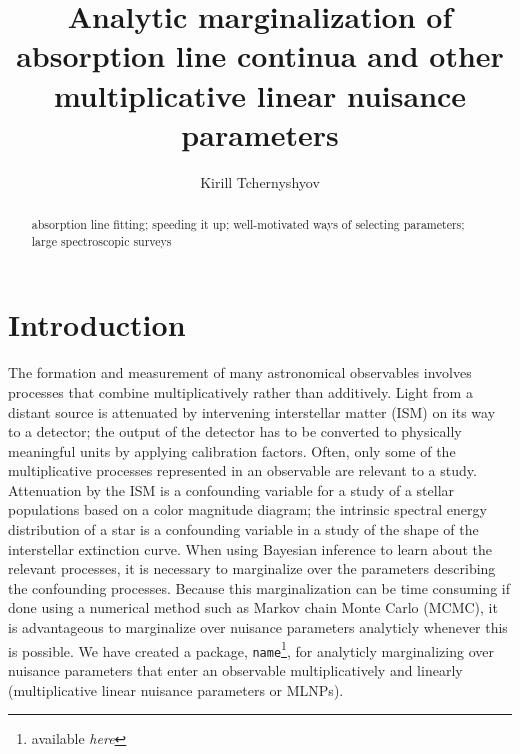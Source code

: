 \documentclass[manuscript]{aastex62}
\begin{document}
\title{Analytic marginalization of absorption line continua and other multiplicative linear nuisance parameters}

\author[0000-0003-0789-9939]{Kirill Tchernyshyov}


\begin{abstract}
absorption line fitting; speeding it up; well-motivated ways of selecting parameters; large spectroscopic surveys
\end{abstract}


\section{Introduction}
\label{sec:introduction}
The formation and measurement of many astronomical observables involves processes that combine multiplicatively rather than additively.
Light from a distant source is attenuated by intervening interstellar matter (ISM) on its way to a detector; the output of the detector has to be converted to physically meaningful units by applying calibration factors.
Often, only some of the multiplicative processes represented in an observable are relevant to a study.
Attenuation by the ISM is a confounding variable for a study of a stellar populations based on a color magnitude diagram; the intrinsic spectral energy distribution of a star is a confounding variable in a study of the shape of the interstellar extinction curve.
When using Bayesian inference to learn about the relevant processes, it is necessary to marginalize over the parameters describing the confounding processes.
Because this marginalization can be time consuming if done using a numerical method such as Markov chain Monte Carlo (MCMC), it is advantageous to marginalize over nuisance parameters analyticly whenever this is possible.
We have created a package, \texttt{name}\footnote{available \emph{here}}, for analyticly marginalizing over nuisance parameters that enter an observable multiplicatively and linearly (multiplicative linear nuisance parameters or MLNPs).
\end{document}
